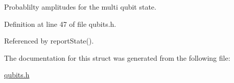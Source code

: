 Probablilty amplitudes for the multi qubit state. 



Definition at line 47 of file qubits.\+h.



Referenced by report\+State().



The documentation for this struct was generated from the following file\+:\begin{DoxyCompactItemize}
\item 
\mbox{\hyperlink{qubits_8h}{qubits.\+h}}\end{DoxyCompactItemize}
